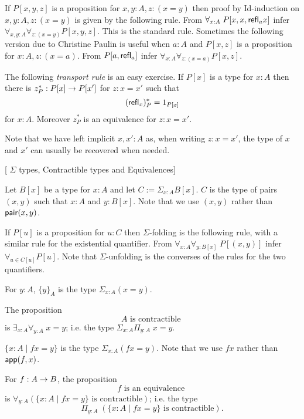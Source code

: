 \item If $P[x,y,z]$ is a proposition for $x,y:A,z:(x=y)$ then proof by Id-induction on
 $x,y:A,z:(x=y)$ is given by the following rule.
From $\forall_{x:A}\; P[x,x,\mathsf{refl}_{a} x]$ infer $\forall_{x,y:A}\forall_{z:(x=y)}P[x,y,z]$.  
This is the standard rule.  Sometimes the following version due to Christine Paulin is useful when $a:A$ and $P[x,z]$ is a proposition for $x:A,z:(x=a)$.
From $P[a,\mathsf{refl}_{a}]$ infer $\forall_{x:A}\forall_{z:(x=a)}P[x,z]$.

\item The following {\em transport rule} is an easy exercise.
If $P[x]$ is a type for $x:A$ then there is $z^*_P:P[x]\rightarrow P[x']$ for $z:x=x'$ such that
  \[ (\mathsf{refl}_{x})^*_P = 1_{P[x]}\] 
for $x:A$.  Moreover $z^*_P$ is an equivalence for $z:x=x'$.

Note that we have left implicit $x,x':A$ as, when writing $z:x=x'$, the type of $x$ and $x'$ can usually be recovered when needed.

[ $\Sigma$ types, Contractible types and Equivalences]
$\;$
\item Let $B[x]$ be a type for $x:A$ and let $C:=\Sigma_{x:A}B[x]$.  $C$ is the type of pairs $(x,y)$ such that $x:A$ and $y:B[x]$.
Note that we use $(x,y)$ rather than ${\sf pair}(x,y)$.

If $P[u]$ is a proposition for $u: C$ then $\Sigma$-folding is the following rule, with a similar rule for the existential quantifier.
From $\forall_{x:A}\forall_{y:B[x]}\; P[{(x,y)}]$ infer $\forall_{u\in C[u]}P[u]$.
Note that $\Sigma$-unfolding is the converses of the rules for the two quantifiers.
\item For $y:A$, $\{ y\}_A$ is the type $\Sigma_{x:A}(x=y)$.

\item The proposition 
  \[ A\mbox{ is contractible }\]
is $\exists_{x:A}\forall_{y:A}\; x=y$; i.e. the type $\Sigma_{x:A}\Pi_{y:A}\; x=y$.
\item $\{ x:A\mid fx =y\}$ is the type $\Sigma_{x:A}(fx = y)$.  Note that we use $fx$ rather than ${\sf app}(f,x)$.
\item For $f:A\rightarrow B$, the proposition
  \[ f\mbox{ is an equivalence }\]
is $\forall_{y:A} (\{ x:A\mid fx=y\}\mbox{ is contractible})$; i.e. the type\\ 
  \[ \Pi_{y:A}\; (\{ x:A\mid fx=y\}\mbox{ is contractible}).\]



